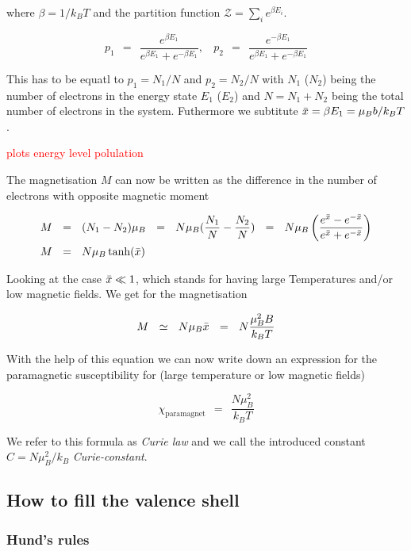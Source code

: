 \documentclass[10pt]{report}
\numberwithin{equation}{chapter}
\begin{document}
where $\beta = 1/k_BT$ and the partition function $\mathcal{Z} = \sum_i e^{\beta E_i}$. 


\begin{equation}
  p_1 ~~=~~ \frac{e^{ \beta E_1}}{e^{\beta E_1} + e^{-\beta E_1}}, ~~~~ 
  p_2 ~~=~~ \frac{e^{-\beta E_1}}{e^{\beta E_1} + e^{-\beta E_1}}
\end{equation}

This has to be equatl to $p_1 = N_1/N$ and $p_2 = N_2/N$ with $N_1$ ($N_2$) being the number of electrons in the energy state $E_1$ ($E_2$) and $N = N_1 + N_2$ being the total number of electrons in the system. Futhermore we subtitute $\Bar{x} = \beta E_1 = \mu_B b/k_B T$.

\textcolor{red}{plots energy level polulation}


The magnetisation $M$ can now be written as the difference in the number of electrons with opposite magnetic moment

\begin{align}
  M ~~& =~~ (N_1 - N_2) \mu_B ~~=~~ N \mu_B (\frac{N_1}{N} - \frac{N_2}{N}) ~~=~~ 
  N \mu_B \left( \frac{e^{\Bar{x}} - e^{-\Bar{x}}}{e^{\Bar{x}} + e^{-\Bar{x}}} \right) \nonumber \\
  M ~~& =~~ N \mu_B \tanh(\Bar{x})
\end{align}


Looking at the case $\Bar{x} \ll 1$, which stands for having large Temperatures and/or low magnetic fields. We get for the magnetisation

\begin{equation}
  M ~~\simeq~~ N \mu_B \Bar{x} ~~=~~ N \frac{\mu_B^2 B}{k_B T}
\end{equation}

With the help of this equation we can now write down an expression for the paramagnetic susceptibility for (large temperature or low magnetic fields)

\begin{equation}
  \chi_\text{paramagnet} ~~=~~ \frac{N \mu_B^2}{k_B T} 
\end{equation}

We refer to this formula as \textit{Curie law} and we call the introduced constant $C = N \mu_B^2/k_B$ \textit{Curie-constant}.


\subsection{How to fill the valence shell}

\subsubsection{Hund's rules}
\end{document}
